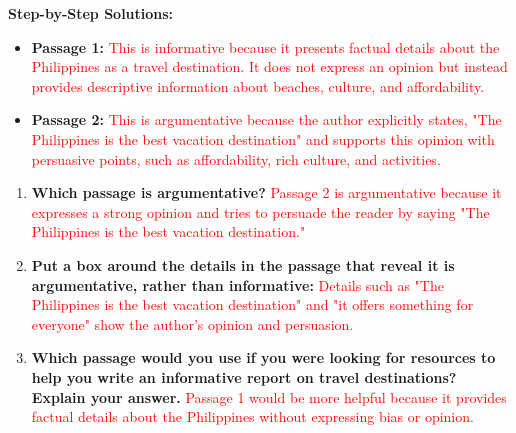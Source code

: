 \documentclass[12pt]{article}
\begin{document}
\vspace{1em}

\begin{tcolorbox}[colframe=black!60, colback=white, 
coltitle=black, colbacktitle=black!15, fonttitle=\bfseries\Large, 
title=Text: Traveling to the Philippines, halign title=center, left=10pt, right=10pt, top=10pt, bottom=15pt]

\textbf{Step-by-Step Solutions:}
\begin{itemize}
    \item \textbf{Passage 1:} \textcolor{red}{This is informative because it presents factual details about the Philippines as a travel destination. It does not express an opinion but instead provides descriptive information about beaches, culture, and affordability.}
    \item \textbf{Passage 2:} \textcolor{red}{This is argumentative because the author explicitly states, "The Philippines is the best vacation destination" and supports this opinion with persuasive points, such as affordability, rich culture, and activities.}
\end{itemize}

\end{tcolorbox}

\vspace{1em}

\begin{tcolorbox}[colframe=black!60, colback=white, 
coltitle=black, colbacktitle=black!15, fonttitle=\bfseries\Large, 
title=Guided Practice, halign title=center, left=10pt, right=10pt, top=10pt, bottom=15pt]

\begin{enumerate}[itemsep=1em]
    \item \textbf{Which passage is argumentative?} \textcolor{red}{Passage 2 is argumentative because it expresses a strong opinion and tries to persuade the reader by saying "The Philippines is the best vacation destination."}
    \item \textbf{Put a box around the details in the passage that reveal it is argumentative, rather than informative:} 
    \textcolor{red}{Details such as "The Philippines is the best vacation destination" and "it offers something for everyone" show the author's opinion and persuasion.}
    \item \textbf{Which passage would you use if you were looking for resources to help you write an informative report on travel destinations? Explain your answer.} 
    \textcolor{red}{Passage 1 would be more helpful because it provides factual details about the Philippines without expressing bias or opinion.}
\end{enumerate}

\end{tcolorbox}
\end{document}
